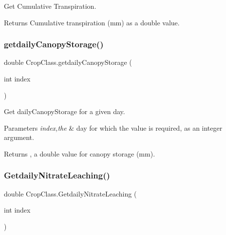 Get Cumulative Transpiration. 

\begin{DoxyReturn}{Returns}
Cumulative transpiration (mm) as a double value. 
\end{DoxyReturn}
\mbox{\label{class_crop_class_a58ec73100806c46a3249f75387959022}} 
\subsubsection{\texorpdfstring{getdailyCanopyStorage()}{getdailyCanopyStorage()}}
{\footnotesize\ttfamily double Crop\+Class.\+getdaily\+Canopy\+Storage (\begin{DoxyParamCaption}\item[{int}]{index }\end{DoxyParamCaption})\hspace{0.3cm}{\ttfamily [inline]}}



Get daily\+Canopy\+Storage for a given day. 


\begin{DoxyParams}{Parameters}
{\em index,the} & day for which the value is required, as an integer argument. \\
\hline
\end{DoxyParams}
\begin{DoxyReturn}{Returns}
, a double value for canopy storage (mm). 
\end{DoxyReturn}
\mbox{\label{class_crop_class_a9bb49dbad723be1d656cb77e9b1b6e6b}} 
\subsubsection{\texorpdfstring{GetdailyNitrateLeaching()}{GetdailyNitrateLeaching()}}
{\footnotesize\ttfamily double Crop\+Class.\+Getdaily\+Nitrate\+Leaching (\begin{DoxyParamCaption}\item[{int}]{index }\end{DoxyParamCaption})\hspace{0.3cm}{\ttfamily [inline]}}



